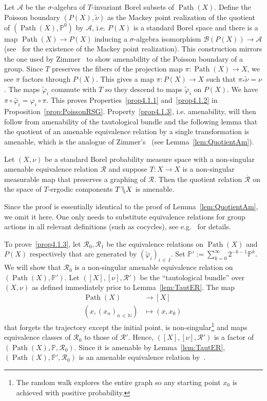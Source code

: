 \documentclass[AHL,Unicode,longabstracts,published]{cedram}
\DeclareMathOperator{\Path}{Path}
\newcommand{\bbN}{\mathbb{N}}
\newcommand{\bbP}{\mathbb{P}}
\newcommand{\calR}{\mathcal{R}}
\newcommand{\calA}{\mathcal{A}}
\newcommand{\calB}{\mathcal{B}}
\newcommand{\backsslash}{\mathbin{\mkern-2mu \char`\\ \mkern-6mu \char`\\ \mkern-4mu}}
\begin{document}
Let $\calA$ be the $\sigma$-algebra of $T$-invariant Borel subsets of $\Path(X)$. Define the Poisson boundary $(P(X),\widetilde{\nu})$ as the Mackey point realization of the quotient of $(\Path(X),\bbP^0)$ by $\calA$, i.e. $P(X)$ is a standard Borel space and there is a map $\Path(X)\to P(X)$ inducing a $\sigma$-algebra isomorphism $\calB(P(X))\to \calA$ (see~\cite{Mackey62} for the existence of the Mackey point realization). This construction mirrors the one used by Zimmer~\cite{Zimmer78} to show amenability of the Poisson boundary of a group. Since $T$ preserves the fibers of the projection map $\pi\colon\Path(X)\to X$, we see $\pi$ factors through $P(X)$. This gives a map $\pi \colon P(X)\to X$ such that $\pi_*\widetilde{\nu}=\nu$. The maps $\widetilde\varphi_i$ commute with $T$ so they descend to maps $\widetilde\varphi_i$ on $P(X)$. We have $\pi\circ \widetilde{\varphi_i}=\varphi_i\circ \pi$. This proves Properties~\eqref{prop4.1.1} and~\eqref{prop4.1.2}  in Proposition~\ref{prop:PoissonRSG}. Property~\eqref{prop4.1.3}, i.e. amenability, will then follow from amenability of the tautological bundle and the following lemma that the quotient of an amenable equivalence relation by a single transformation is amenable, which is the analogue of Zimmer's~\cite[Theorem~3.3]{Zimmer78} (see Lemma~\ref{lem:QuotientAm}).

\begin{lemm}\label{lem:QuotientAMforER}
Let $(X,\nu)$ be a standard Borel probability measure space with a non-singular amenable equivalence relation $\calR$ and suppose $T:X\to X$ is a non-singular measurable map that preserves a graphing of $\calR$. Then the quotient relation $\overline{\calR}$ on the space of $T$-ergodic components $T\backsslash X$ is amenable.
\end{lemm}

Since the proof is essentially identical to the proof of Lemma~\ref{lem:QuotientAm}, we omit it here. One only needs to substitute equivalence relations for group actions in all relevant definitions (such as cocycles), see e.g.~\cite[Proposition~3.3]{MR1242044} for details.


To prove~\eqref{prop4.1.3}, let $\calR_0,\calR_1$ be the equivalence relations on $\Path(X)$ and $P(X)$ respectively that are generated by $(\widetilde \varphi_i)_{i\,\in\,I}$. Set $\bbP':=\sum_{k=0}^\infty 2^{-k-1}{\bbP^k}.$ We will show that $\calR_0$ is a non-singular amenable equivalence relation on $(\Path(X),\bbP')$. Let $([X],[\nu],\calR')$ be the ``tautological bundle'' over $(X,\nu)$ as defined immediately prior to Lemma~\ref{lem:TautER}. The map
\begin{align*}
\Path(X) &\longrightarrow [X]\\
\left(x,(x_n)_{n\,\in\,\bbN}\right)&\mapsto (x,x_0)\
\end{align*}
that forgets the trajectory except the initial point, is non-singular\footnote{The random walk explores the entire graph so any starting point $x_0$ is achieved with positive probability.} and maps equivalence classes of $\calR_0$ to those of $\calR'$. Hence, $([X],[\nu],\calR')$ is a factor of $(\Path(X),\bbP,\calR_0)$. Since it is amenable by Lemma~\ref{lem:TautER}, $(\Path(X),\bbP',\calR_0)$ is an amenable equivalence relation by~\cite[Theorem~2.4]{Zimmer78}.
\end{document}
